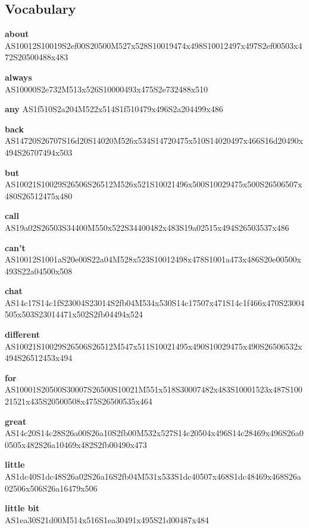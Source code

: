 \documentclass{article}
\begin{document}
\subsection{Vocabulary}

\begin{glossary}

\textbf{about}\\
AS10012S10019S2ef00S20500M527x528S10019474x498S10012497x497S2ef00503x472S20500488x483

\textbf{always}\\
AS10000S2e732M513x526S10000493x475S2e732488x510

\textbf{any}
AS1f510S2a204M522x514S1f510479x496S2a204499x486

\textbf{back}\\
AS14720S26707S16d20S14020M526x534S14720475x510S14020497x466S16d20490x494S26707494x503

\textbf{but}\\
AS10021S10029S26506S26512M526x521S10021496x500S10029475x500S26506507x480S26512475x480

\textbf{call}\\
AS19a02S26503S34400M550x522S34400482x483S19a02515x494S26503537x486

\textbf{can't}\\
AS10012S1001aS20e00S22a04M528x523S10012498x478S1001a473x486S20e00500x493S22a04500x508

\textbf{chat}\\
AS14c17S14c1fS23004S23014S2fb04M534x530S14c17507x471S14c1f466x470S23004505x503S23014471x502S2fb04494x524

\textbf{different}\\
AS10021S10029S26506S26512M547x511S10021495x490S10029475x490S26506532x494S26512453x494

\textbf{for}\\
AS10001S20500S30007S26500S10021M551x518S30007482x483S10001523x487S10021521x435S20500508x475S26500535x464

\textbf{great}\\
AS14c20S14c28S26a00S26a10S2fb00M532x527S14c20504x496S14c28469x496S26a00505x482S26a10469x482S2fb00490x473

\textbf{little}\\
AS1dc40S1dc48S26a02S26a16S2fb04M531x533S1dc40507x468S1dc48469x468S26a02506x506S26a16479x506

\textbf{little bit}\\
AS1ea30S21d00M514x516S1ea30491x495S21d00487x484


\end{glossary}
\end{document}

